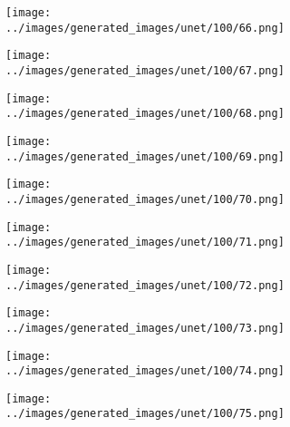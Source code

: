\begin{figure}[H]
\begin{subfigure}[b]{0.1\textwidth}
\centering
\texttt{[image: ../images/generated\_images/unet/100/66.png]}
\end{subfigure}
\hspace{1em}%
\begin{subfigure}[b]{0.1\textwidth}
\centering
\texttt{[image: ../images/generated\_images/unet/100/67.png]}
\end{subfigure}
\hspace{1em}%
\begin{subfigure}[b]{0.1\textwidth}
\centering
\texttt{[image: ../images/generated\_images/unet/100/68.png]}
\end{subfigure}
\hspace{1em}%
\begin{subfigure}[b]{0.1\textwidth}
\centering
\texttt{[image: ../images/generated\_images/unet/100/69.png]}
\end{subfigure}
\hspace{1em}%
\begin{subfigure}[b]{0.1\textwidth}
\centering
\texttt{[image: ../images/generated\_images/unet/100/70.png]}
\end{subfigure}
\hspace{1em}%
\begin{subfigure}[b]{0.1\textwidth}
\centering
\texttt{[image: ../images/generated\_images/unet/100/71.png]}
\end{subfigure}
\hspace{1em}%
\begin{subfigure}[b]{0.1\textwidth}
\centering
\texttt{[image: ../images/generated\_images/unet/100/72.png]}
\end{subfigure}
\hspace{1em}%
\begin{subfigure}[b]{0.1\textwidth}
\centering
\texttt{[image: ../images/generated\_images/unet/100/73.png]}
\end{subfigure}
\hspace{1em}%
\begin{subfigure}[b]{0.1\textwidth}
\centering
\texttt{[image: ../images/generated\_images/unet/100/74.png]}
\end{subfigure}
\hspace{1em}%
\begin{subfigure}[b]{0.1\textwidth}
\centering
\texttt{[image: ../images/generated\_images/unet/100/75.png]}
\end{subfigure}

\end{figure}
